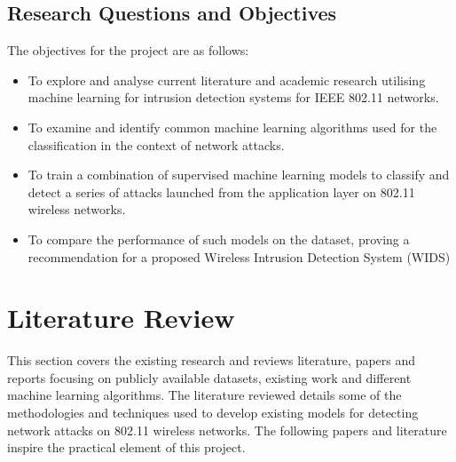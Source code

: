 \subsection{Research Questions and Objectives}
\label{sec:Research Question}

The objectives for the project are as follows:
\begin{itemize}
\item To explore and analyse current literature and academic research utilising machine learning for intrusion detection systems for IEEE 802.11 networks.
\end{itemize}
\begin{itemize}
\item To examine and identify common machine learning algorithms used for the classification in the context of network attacks.
\end{itemize}
\begin{itemize}
\item To train a combination of supervised machine learning models to classify and detect a series of attacks launched from the application layer on 802.11 wireless networks.
\item To compare the performance of such models on the dataset, proving a recommendation for a proposed Wireless Intrusion Detection System (WIDS)
\end{itemize}



\section{Literature Review}                               
\label{sec: Literature Review}

This section covers the existing research and reviews literature, papers and reports focusing on publicly available datasets, existing work and different machine learning algorithms. The literature reviewed details some of the methodologies and techniques used to develop existing models for detecting network attacks on 802.11 wireless networks. The following papers and literature inspire the practical element of this project.

